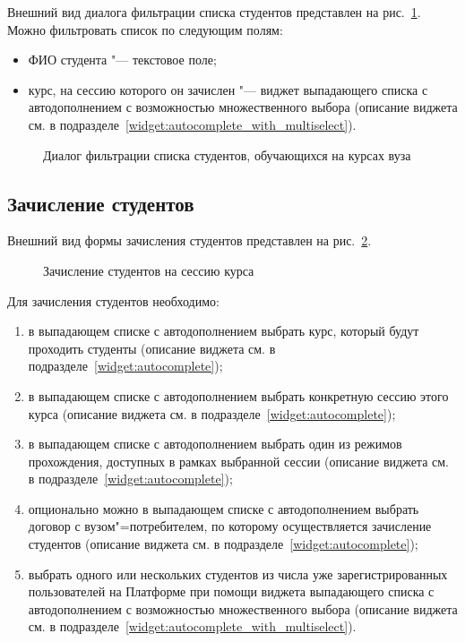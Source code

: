 Внешний вид диалога фильтрации списка студентов представлен на рис.~\ref{img:student:enrolled_list_filter}.
Можно фильтровать список по следующим полям:
\begin{itemize}
	\item ФИО студента "--- текстовое поле;
	\item курс, на сессию которого он зачислен "--- виджет выпадающего списка с автодополнением с возможностью 
	множественного выбора (описание виджета см. в подразделе~\ref{widget:autocomplete_with_multiselect}).
\end{itemize}

\begin{figure}[H]
	\caption{Диалог фильтрации списка студентов, обучающихся на курсах вуза}
	\label{img:student:enrolled_list_filter}
\end{figure}

\subsection{Зачисление студентов}
Внешний вид формы зачисления студентов представлен на рис.~\ref{img:student:enroll}. 

\begin{figure}[H]
	\caption{Зачисление студентов на сессию курса}
	\label{img:student:enroll}
\end{figure}

Для зачисления студентов необходимо:
\begin{enumerate}
	\item в выпадающем списке с автодополнением выбрать курс, который будут проходить студенты 
	(описание виджета см. в подразделе~\ref{widget:autocomplete});
	\item в выпадающем списке с автодополнением выбрать конкретную сессию этого курса 
	(описание виджета см. в подразделе~\ref{widget:autocomplete});
	\item в выпадающем списке с автодополнением выбрать один из режимов прохождения, доступных в рамках выбранной сессии 
	(описание виджета см. в подразделе~\ref{widget:autocomplete});
	\item опционально можно в выпадающем списке с автодополнением выбрать договор с вузом"=потребителем, 
	по которому осуществляется зачисление студентов (описание виджета см. в подразделе~\ref{widget:autocomplete});
	\item выбрать одного или нескольких студентов из числа уже зарегистрированных пользователей на Платформе при помощи 
	виджета выпадающего списка с автодополнением с возможностью множественного выбора 
	(описание виджета см. в подразделе~\ref{widget:autocomplete_with_multiselect}). 
\end{enumerate}

